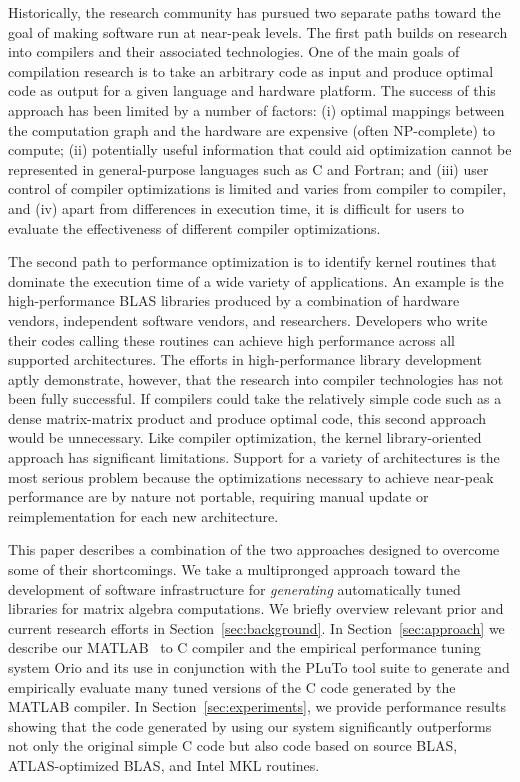 \documentclass[runningheads]{llncs}
\begin{document}
Historically, the research community has pursued two separate paths toward
the goal of making software run at near-peak levels.  The first path builds
on research into compilers and their associated technologies.  One of the
main goals of compilation research is to take an arbitrary code as input and
produce optimal code as output for a given language and hardware platform.
The success of this approach has been limited by a number of factors: (i)
optimal mappings between the computation graph and the hardware are expensive
(often NP-complete) to compute; (ii) potentially useful information that
could aid optimization cannot be represented in general-purpose languages
such as C and Fortran; and (iii) user control of compiler optimizations is
limited and varies from compiler to compiler, and (iv) apart from differences
in execution time, it is difficult for users to evaluate the effectiveness of
different compiler optimizations.

The second path to performance optimization is to identify kernel
routines that dominate the execution time of a wide variety of
applications.  
An example is the high-performance BLAS libraries produced by a combination
of hardware vendors, independent software vendors, and researchers.
Developers who write their codes calling these routines can achieve high
performance across all supported architectures. The efforts in
high-performance library development aptly demonstrate, however, that the
research into compiler technologies has not been fully successful.  If
compilers could take the relatively simple code such as a dense matrix-matrix
product and produce optimal code, this second approach would be unnecessary.
Like compiler optimization, the kernel library-oriented approach has
significant limitations.  Support for a variety of architectures is the most
serious problem because the optimizations necessary to achieve near-peak
performance are by nature not portable, requiring manual update or
reimplementation for each new architecture.

This paper describes a combination of the two approaches designed to overcome
some of their shortcomings. We take a multipronged approach
toward the development of software infrastructure for \emph{generating}
automatically tuned libraries for matrix algebra computations.  We briefly
overview relevant prior and current research efforts in
Section~\ref{sec:background}. In Section~\ref{sec:approach} we describe our
MATLAB~\cite{matlab:webpage} to C compiler and the empirical performance tuning system Orio and its
use in conjunction with the PLuTo tool suite to generate and empirically
evaluate many tuned versions of the C code generated by the MATLAB compiler.
In Section~\ref{sec:experiments}, we provide performance results showing that
the code generated by using our system significantly outperforms not only the
original simple C code but also code based on source BLAS, ATLAS-optimized
BLAS, and Intel MKL routines.
\end{document}
